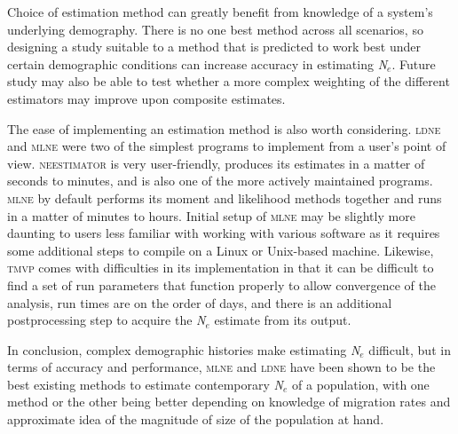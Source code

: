Choice of estimation method can greatly benefit from knowledge of a system's underlying 
demography. There is no one best method across all scenarios, so designing a study suitable to 
a method that is predicted to work best under certain demographic conditions can increase 
accuracy in estimating \emph{N}$_e$. Future study may also be able to test whether a more 
complex weighting of the different estimators may improve upon composite estimates.

The ease of implementing an estimation method is also worth considering. \textsc{ldne} 
and \textsc{mlne} were two of the simplest programs to implement from a user's point of view. 
\textsc{neestimator} is very user-friendly, produces its estimates in a matter of seconds to
minutes, and is also one of the more actively maintained programs. \textsc{mlne} by default 
performs its moment and likelihood methods together and runs in a matter of minutes to hours. 
Initial setup of \textsc{mlne} may be slightly more daunting to users less familiar with 
working with various software as it requires some additional steps to compile on a Linux 
or Unix-based machine. Likewise, \textsc{tmvp} comes with difficulties in its implementation 
in that it can be difficult to find a set of run parameters that function properly to allow 
convergence of the analysis, run times are on the order of days, and there is an additional 
postprocessing step to acquire the \emph{N}$_e$ estimate from its output.

In conclusion, complex demographic histories make estimating \emph{N}$_e$ difficult, 
but in terms of accuracy and performance, \textsc{mlne} and \textsc{ldne} have been shown 
to be the best existing methods to estimate contemporary \emph{N}$_e$ of a population, 
with one method or the other being better depending on knowledge of migration rates and 
approximate idea of the magnitude of size of the population at hand.




